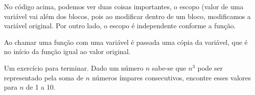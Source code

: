 \documentclass[a4paper]{article}
\begin{document}
 No código acima, podemos ver duas coisas importantes, o escopo (valor de uma variável
vai além dos blocos, pois ao modificar dentro de um bloco, modificamos a variável original.
 Por outro lado, o escopo é independente conforme a função.

 Ao chamar uma função com uma variável é passada uma cópia da variável, que é no início da
função igual ao valor original.

 Um exercício para terminar. Dado um número \(n\) sabe-se que \(n^3\) pode ser representado pela
soma de \(n\) números ímpares consecutivos, encontre esses valores para \(n\) de 1 a 10.
\end{document}
